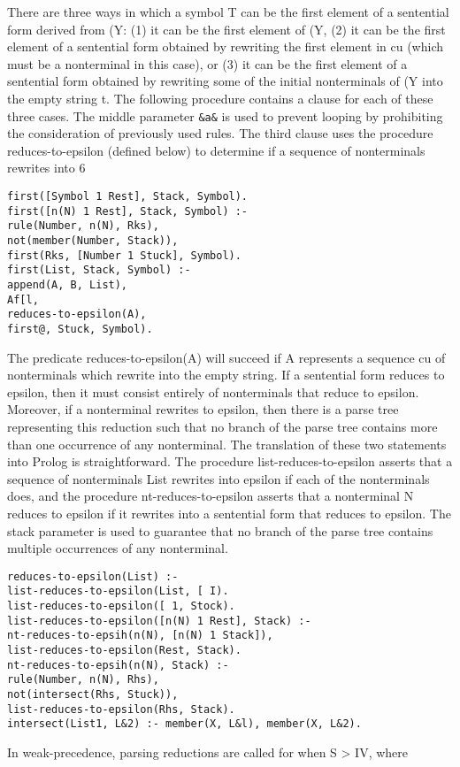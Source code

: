 There are three ways in which a symbol T can be the first element of a
sentential form derived from (Y: (1) it can be the first element of (Y, (2) it can be
the first element of a sentential form obtained by rewriting the first element in
cu (which must be a nonterminal in this case), or (3) it can be the first element
of a sentential form obtained by rewriting some of the initial nonterminals of (Y
into the empty string t. The following procedure contains a clause for each of
these three cases. The middle parameter \verb|&a&| is used to prevent looping by
prohibiting the consideration of previously used rules. The third clause uses the
procedure reduces-to-epsilon (defined below) to determine if a sequence of
nonterminals rewrites into 6 
\begin{verbatim}
first([Symbol 1 Rest], Stack, Symbol).
first([n(N) 1 Rest], Stack, Symbol) :-
rule(Number, n(N), Rks),
not(member(Number, Stack)),
first(Rks, [Number 1 Stuck], Symbol).
first(List, Stack, Symbol) :-
append(A, B, List),
Af[l,
reduces-to-epsilon(A),
first@, Stuck, Symbol). 
\end{verbatim}   
The predicate reduces-to-epsilon(A) will succeed if A represents a sequence cu of
nonterminals which rewrite into the empty string. If a sentential form reduces
to epsilon, then it must consist entirely of nonterminals that reduce to epsilon.
Moreover, if a nonterminal rewrites to epsilon, then there is a parse tree
representing this reduction such that no branch of the parse tree contains more
than one occurrence of any nonterminal. The translation of these two statements
into Prolog is straightforward. The procedure list-reduces-to-epsilon asserts that
a sequence of nonterminals List rewrites into epsilon if each of the nonterminals
does, and the procedure nt-reduces-to-epsilon asserts that a nonterminal N
reduces to epsilon if it rewrites into a sentential form that reduces to epsilon.
The stack parameter is used to guarantee that no branch of the parse tree
contains multiple occurrences of any nonterminal. 
\begin{verbatim}
reduces-to-epsilon(List) :-
list-reduces-to-epsilon(List, [ I).
list-reduces-to-epsilon([ 1, Stock).
list-reduces-to-epsilon([n(N) 1 Rest], Stack) :-
nt-reduces-to-epsih(n(N), [n(N) 1 Stack]),
list-reduces-to-epsilon(Rest, Stack).
nt-reduces-to-epsih(n(N), Stack) :-
rule(Number, n(N), Rhs),
not(intersect(Rhs, Stuck)),
list-reduces-to-epsilon(Rhs, Stack).
intersect(List1, L&2) :- member(X, L&l), member(X, L&2). 
\end{verbatim}
In weak-precedence, parsing reductions are called for when S > IV, where

